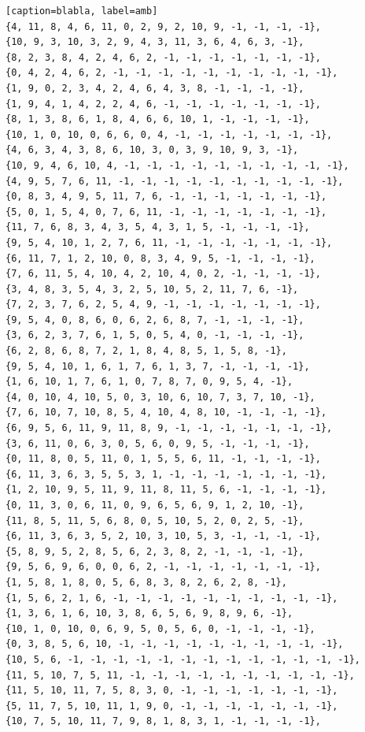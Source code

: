 \documentclass[12pt]{article}
\begin{document}
\begin{lstlisting}[frame=single][caption=blabla, label=amb]
{4, 11, 8, 4, 6, 11, 0, 2, 9, 2, 10, 9, -1, -1, -1, -1},
{10, 9, 3, 10, 3, 2, 9, 4, 3, 11, 3, 6, 4, 6, 3, -1},
{8, 2, 3, 8, 4, 2, 4, 6, 2, -1, -1, -1, -1, -1, -1, -1},
{0, 4, 2, 4, 6, 2, -1, -1, -1, -1, -1, -1, -1, -1, -1, -1},
{1, 9, 0, 2, 3, 4, 2, 4, 6, 4, 3, 8, -1, -1, -1, -1},
{1, 9, 4, 1, 4, 2, 2, 4, 6, -1, -1, -1, -1, -1, -1, -1},
{8, 1, 3, 8, 6, 1, 8, 4, 6, 6, 10, 1, -1, -1, -1, -1},
{10, 1, 0, 10, 0, 6, 6, 0, 4, -1, -1, -1, -1, -1, -1, -1},
{4, 6, 3, 4, 3, 8, 6, 10, 3, 0, 3, 9, 10, 9, 3, -1},
{10, 9, 4, 6, 10, 4, -1, -1, -1, -1, -1, -1, -1, -1, -1, -1},
{4, 9, 5, 7, 6, 11, -1, -1, -1, -1, -1, -1, -1, -1, -1, -1},
{0, 8, 3, 4, 9, 5, 11, 7, 6, -1, -1, -1, -1, -1, -1, -1},
{5, 0, 1, 5, 4, 0, 7, 6, 11, -1, -1, -1, -1, -1, -1, -1},
{11, 7, 6, 8, 3, 4, 3, 5, 4, 3, 1, 5, -1, -1, -1, -1},
{9, 5, 4, 10, 1, 2, 7, 6, 11, -1, -1, -1, -1, -1, -1, -1},
{6, 11, 7, 1, 2, 10, 0, 8, 3, 4, 9, 5, -1, -1, -1, -1},
{7, 6, 11, 5, 4, 10, 4, 2, 10, 4, 0, 2, -1, -1, -1, -1},
{3, 4, 8, 3, 5, 4, 3, 2, 5, 10, 5, 2, 11, 7, 6, -1},
{7, 2, 3, 7, 6, 2, 5, 4, 9, -1, -1, -1, -1, -1, -1, -1},
{9, 5, 4, 0, 8, 6, 0, 6, 2, 6, 8, 7, -1, -1, -1, -1},
{3, 6, 2, 3, 7, 6, 1, 5, 0, 5, 4, 0, -1, -1, -1, -1},
{6, 2, 8, 6, 8, 7, 2, 1, 8, 4, 8, 5, 1, 5, 8, -1},
{9, 5, 4, 10, 1, 6, 1, 7, 6, 1, 3, 7, -1, -1, -1, -1},
{1, 6, 10, 1, 7, 6, 1, 0, 7, 8, 7, 0, 9, 5, 4, -1},
{4, 0, 10, 4, 10, 5, 0, 3, 10, 6, 10, 7, 3, 7, 10, -1},
{7, 6, 10, 7, 10, 8, 5, 4, 10, 4, 8, 10, -1, -1, -1, -1},
{6, 9, 5, 6, 11, 9, 11, 8, 9, -1, -1, -1, -1, -1, -1, -1},
{3, 6, 11, 0, 6, 3, 0, 5, 6, 0, 9, 5, -1, -1, -1, -1},
{0, 11, 8, 0, 5, 11, 0, 1, 5, 5, 6, 11, -1, -1, -1, -1},
{6, 11, 3, 6, 3, 5, 5, 3, 1, -1, -1, -1, -1, -1, -1, -1},
{1, 2, 10, 9, 5, 11, 9, 11, 8, 11, 5, 6, -1, -1, -1, -1},
{0, 11, 3, 0, 6, 11, 0, 9, 6, 5, 6, 9, 1, 2, 10, -1},
{11, 8, 5, 11, 5, 6, 8, 0, 5, 10, 5, 2, 0, 2, 5, -1},
{6, 11, 3, 6, 3, 5, 2, 10, 3, 10, 5, 3, -1, -1, -1, -1},
{5, 8, 9, 5, 2, 8, 5, 6, 2, 3, 8, 2, -1, -1, -1, -1},
{9, 5, 6, 9, 6, 0, 0, 6, 2, -1, -1, -1, -1, -1, -1, -1},
{1, 5, 8, 1, 8, 0, 5, 6, 8, 3, 8, 2, 6, 2, 8, -1},
{1, 5, 6, 2, 1, 6, -1, -1, -1, -1, -1, -1, -1, -1, -1, -1},
{1, 3, 6, 1, 6, 10, 3, 8, 6, 5, 6, 9, 8, 9, 6, -1},
{10, 1, 0, 10, 0, 6, 9, 5, 0, 5, 6, 0, -1, -1, -1, -1},
{0, 3, 8, 5, 6, 10, -1, -1, -1, -1, -1, -1, -1, -1, -1, -1},
{10, 5, 6, -1, -1, -1, -1, -1, -1, -1, -1, -1, -1, -1, -1, -1},
{11, 5, 10, 7, 5, 11, -1, -1, -1, -1, -1, -1, -1, -1, -1, -1},
{11, 5, 10, 11, 7, 5, 8, 3, 0, -1, -1, -1, -1, -1, -1, -1},
{5, 11, 7, 5, 10, 11, 1, 9, 0, -1, -1, -1, -1, -1, -1, -1},
{10, 7, 5, 10, 11, 7, 9, 8, 1, 8, 3, 1, -1, -1, -1, -1},

\end{lstlisting}
\end{document}

